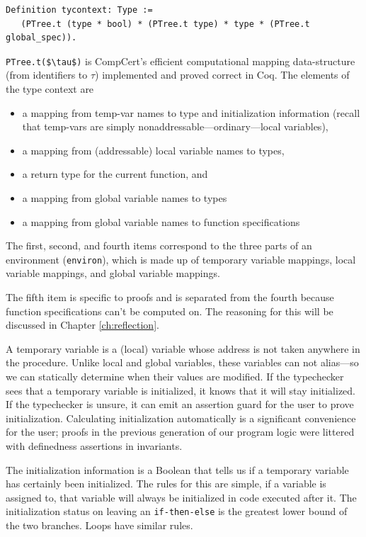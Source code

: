 \documentclass{puthesis}
\begin{document}
\begin{lstlisting}
Definition tycontext: Type :=
   (PTree.t (type * bool) * (PTree.t type) * type * (PTree.t global_spec)).
\end{lstlisting}
\lstinline|PTree.t($\tau$)| is CompCert's efficient computational 
mapping data-structure
(from identifiers to $\tau$) implemented
and proved correct in Coq.  
The elements of the type context are
\begin{itemize}
  \item a mapping from temp-var names to type and initialization
  information (recall that temp-vars are simply nonaddressable---ordinary---local variables),
  \item a mapping from (addressable) local variable names to types,
  \item a return type for the current function, and
  \item a mapping from global variable names to types
  \item a mapping from global variable names to function specifications
\end{itemize}

The first, second, and fourth items correspond to the three parts of
an environment (\lstinline|environ|), which is made up of temporary
variable mappings, local variable mappings, and global variable
mappings.

The fifth item is specific to proofs and is separated from the fourth
because function specifications can't be computed on. The reasoning
for this will be discussed in Chapter \ref{ch:reflection}. 

A temporary variable is a (local) variable whose address is not taken
anywhere in the procedure.  Unlike local and global variables,
these variables can not alias---so we can statically determine when their
values are modified. If the typechecker sees that a temporary variable
is initialized, it knows that it will stay initialized. If the
typechecker is unsure, it can emit an assertion guard for the user to
prove initialization. Calculating initialization automatically is a
significant convenience for the user; proofs in the previous
generation of our program logic were littered with definedness
assertions in invariants.

The initialization information is a Boolean that tells us if a
temporary variable has certainly been initialized. The rules for this
are simple, if a variable is assigned to, that variable will always be
initialized in code executed after it.  The initialization status on
leaving an \lstinline|if-then-else| is the greatest lower bound of the two
branches. Loops have similar rules.
\end{document}
